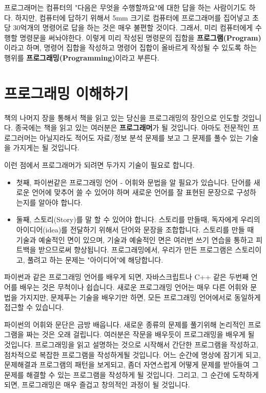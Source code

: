 프로그래머는 컴퓨터의 "다음은 무엇을 수행할까요"에 대한 답을 하는 사람이기도 하다. 하지만, 컴퓨터에 답하기 위해서 5mm 크기로 컴퓨터에 프로그래머를 집어넣고 초당 30억개의 명령어로 답을 하는 것은 매우 불편할 것이다. 그래서, 미리 컴퓨터에게 수행할 명령문을 써놔야한다. 이렇게 미리 작성된 명령문의 집합을 {\bf 프로그램(Program)}이라고 하며, 명령어 집합을 작성하고 명령어 집합이 올바르게 작성될 수 있도록 하는 행위를 {\bf 프로그래밍(Programming)}이라고 부른다.



\section{프로그래밍 이해하기}

책의 나머지 장을 통해서 책을 읽고 있는 당신을 프로그래밍의 장인으로 인도할 것입니다. 종국에는 책을 읽고 있는 여러분은 {\bf 프로그래머}가 될 것입니다. 아마도 전문적인 프로그러머는 아닐지라도 적어도 자료/정보 분석 문제를 보고 그 문제를 풀수 있는 기술을 가지게는 될 것입니다.


이런 점에서 프로그래머가 되려면 두가지 기술이 필요로 합니다.

\begin{itemize}

\item 첫째, 파이썬같은 프로그래밍 언어 - 어휘와 문법을 알 필요가 있습니다. 단어를 새로운 언어에 맞추어 쓸 수 있어야 하며 새로운 언어를 잘 표현된 문장으로 구성하는지를 알아야 합니다.

\item 둘째, 스토리(Story)를 말 할 수 있어야 합니다. 스토리를 만들때, 독자에게 우리의 아이디어(idea)를 전달하기 위해서 단어와 문장을 조합합니다. 스토리를 만들 때 기술과 예술적인 면이 있으며, 기술과 예술적인 면은 여러번 쓰기 연습을 통하고 피트백을 받으므로써 향상됩니다. 프로그래밍에서, 우리가 만든 프로그램은 스토리이고, 풀려고 하는 문제는 "아이디어"에 해당합니다.

\end{itemize}

파이썬과 같은 프로그래밍 언어를 배우게 되면, 자바스크립트나 C++ 같은 두번째 언어를 배우는 것은 무척이나 쉽습니다. 새로운 프로그래밍 언어는 매우 다른 어휘와 문법을 가지지만, 문제푸는 기술을 배우기만 하면, 모든 프로그래밍 언어에서로 동일하게 접근할 수 있습니다.

파이썬의 어휘와 문단은 금방 배웁니다. 새로운 종류의 문제를 풀기위해 논리적인 프로그램을 짜는 것은 오래 걸립니다. 여러분은 작문을 배우듯이 프로그래밍을 배우게 될 것입니다. 프로그래밍을 읽고 설명하는 것으로 시작해서 간단한 프로그램을 작성하고, 점차적으로 복잡한 프로그램을 작성하게될 것입니다. 어느 순간에 명상에 잠기게 되고, 문제해결과 프로그램의 패턴을 보게되고, 좀더 자연스럽게 어떻게 문제를 받아들여 그 문제를 해결할 수 있는 프로그램을 작성하게 될 것입니다. 그리고, 그 순간에 도착하게 되면, 프로그래밍은 매우 즐겁고 창의적인 과정이 될 것입니다.

